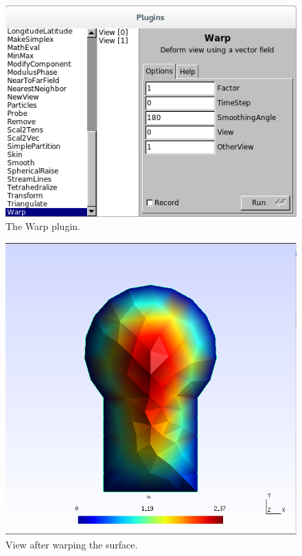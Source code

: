 \documentclass[a4paper,12pt]{article}
\begin{document}
\begin{figure}
\caption{The Warp plugin.}
\label{fig: Warp}
\begin{center}
\includegraphics[scale=0.4]{images/warp.png}
\end{center}
\end{figure}

\begin{figure}
\caption{View after warping the surface.}
\label{fig: warped surface}
\begin{center}
\includegraphics[scale=0.4]{images/warped_surface.png}
\end{center}
\end{figure}
\end{document}

